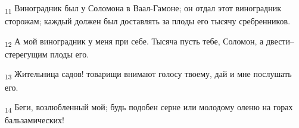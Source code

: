 \begin{tcolorbox}
\textsubscript{11} Виноградник был у Соломона в Ваал-Гамоне; он отдал этот виноградник сторожам; каждый должен был доставлять за плоды его тысячу сребренников.
\end{tcolorbox}
\begin{tcolorbox}
\textsubscript{12} А мой виноградник у меня при себе. Тысяча пусть тебе, Соломон, а двести--стерегущим плоды его.
\end{tcolorbox}
\begin{tcolorbox}
\textsubscript{13} Жительница садов! товарищи внимают голосу твоему, дай и мне послушать его.
\end{tcolorbox}
\begin{tcolorbox}
\textsubscript{14} Беги, возлюбленный мой; будь подобен серне или молодому оленю на горах бальзамических!
\end{tcolorbox}
